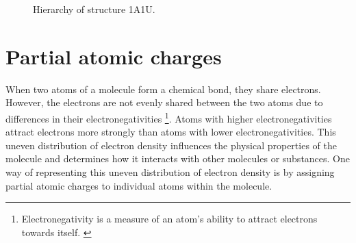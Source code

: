 \documentclass[
  digital,     %
  oneside,     %
  nosansbold,  %
  nocolorbold, %
  lof,         %
  lot,         %
]{fithesis4}
\begin{document}

\begin{figure}[htbp]
  \centering
  \caption{Hierarchy of structure 1A1U.}
  \label{fig:structure}
\end{figure}


\section{Partial atomic charges}
\label{section:partial_atomic_charges}

When two atoms of a molecule form a chemical bond, they share electrons. However, the electrons are not evenly shared between the two atoms due to differences in their electronegativities \footnote[1]{Electronegativity is a measure of an atom's ability to attract electrons towards itself. \cite{racek2022thesis}}. Atoms with higher electronegativities attract electrons more strongly than atoms with lower electronegativities. This uneven distribution of electron density influences the physical properties of the molecule and determines how it interacts with other molecules or substances. One way of representing this uneven distribution of electron density is by assigning partial atomic charges to individual atoms within the molecule. \cite{racek2022thesis,schindler2019thesis}
\end{document}
